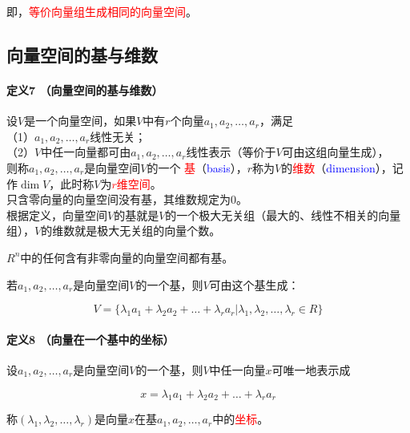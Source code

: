 \documentclass[UTF8]{ctexbook}
\begin{document}
即，\textcolor{red}{等价向量组生成相同的向量空间}。

\subsection{向量空间的基与维数}

\paragraph{定义7 （向量空间的基与维数）} 设$V$是一个向量空间，如果$V$中有$r$个向量$a_{1},a_{2},\dots,a_{r}$，满足\\（1）$a_ {1},a_{2},\dots,a_{r}$线性无关；\\（2）$V$中任一向量都可由$a_ {1},a_{2},\dots,a_{r}$线性表示（等价于$V$可由这组向量生成），\\则称$a_ {1},a_{2},\dots,a_{r}$是向量空间$V$的一个
\textcolor{red}{基}（\textcolor{blue}{basis}），$r$称为$V$的\textcolor{red}{维数}（\textcolor{blue}{dimension}），记作$\dim V$，此时称$V$为\textcolor{red}{$r$维空间}。\\

只含零向量的向量空间没有基，其维数规定为0。\\

根据定义，向量空间$V$的基就是$V$的一个极大无关组（最大的、线性不相关的向量组），$V$的维数就是极大无关组的向量个数。

$R^{n}$中的任何含有非零向量的向量空间都有基。

若$a_ {1},a_{2},\dots,a_{r}$是向量空间$V$的一个基，则$V$可由这个基生成：

\begin{displaymath}
V=\{ \lambda_{1}a_{1}+\lambda_{2}a_{2}+\dots+\lambda_{r}a_{r} | \lambda_{1},\lambda_{2},\dots,\lambda_{r} \in R \}
\end{displaymath}

\paragraph{定义8 （向量在一个基中的坐标）}设$a_ {1},a_{2},\dots,a_{r}$是向量空间$V$的一个基，则$V$中任一向量$x$可唯一地表示成

\begin{displaymath}
x= \lambda_{1}a_{1}+\lambda_{2}a_{2}+\dots+\lambda_{r}a_{r}
\end{displaymath}

称$(\lambda_{1},\lambda_{2},\dots,\lambda_{r})$是向量$x$在基$a_ {1},a_{2},\dots,a_{r}$中的\textcolor{red}{坐标}。
\end{document}
